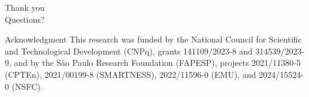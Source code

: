\documentclass[9pt,aspectratio=169]{beamer}
\begin{document}
\begin{frame}[standout]
  Thank you\\
  \vspace{0.5em}
  \normalsize\normalfont
  Questions?
\end{frame}

\begin{frame}{Acknowledgment}
  \footnotesize
  This research was funded by the National Council for Scientific and Technological Development (CNPq), grants 141109/2023-8 and 314539/2023-9, and by the S\~ao Paulo Research Foundation (FAPESP), projects 2021/11380-5 (CPTEn), 2021/00199-8 (SMARTNESS), 2022/11596-0 (EMU), and 2024/15524-0 (NSFC).
\end{frame}
\end{document}
